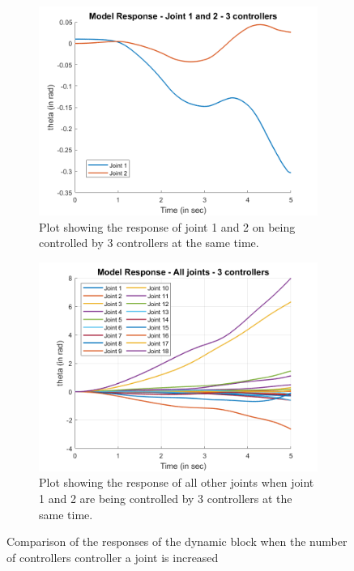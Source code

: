 \documentclass[a4paper,12pt]{report}
\begin{document}
\begin{figure}[H]
\begin{subfigure}{0.5\textwidth}
		\centering
		\includegraphics[width=\linewidth]{images/3-controllers-joint1and2.png}  
		\caption{Plot showing the response of joint 1 and 2 on being controlled by 3 controllers at the same time.}
	\end{subfigure}
	\begin{subfigure}{0.5\textwidth}
		\centering
		\includegraphics[width=\linewidth]{images/3-controllers-all.png}  
		\caption{Plot showing the response of all other joints when joint 1 and 2 are being controlled by 3 controllers at the same time.}
	\end{subfigure}
	\caption{Comparison of the responses of the dynamic block when the number of controllers controller a joint is increased}
	\label{number-of-controllers}
\end{figure}
\end{document}

